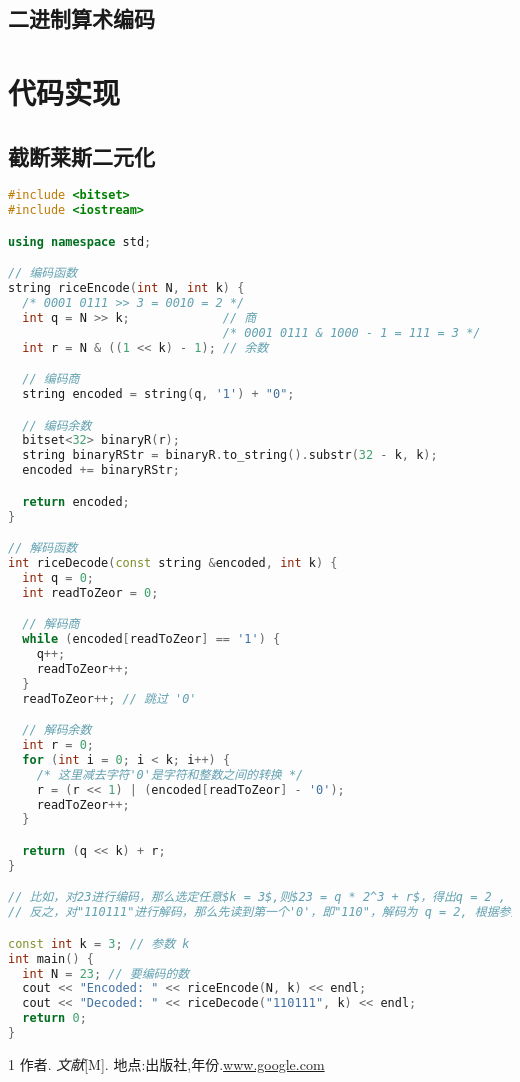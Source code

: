 \documentclass{/home/hi/Study/template/code}
\begin{document}
\subsection{二进制算术编码}


\newpage
\section{代码实现}
\subsection{截断莱斯二元化}
\begin{lstlisting}[language=c++]
#include <bitset>
#include <iostream>

using namespace std;

// 编码函数
string riceEncode(int N, int k) {
  /* 0001 0111 >> 3 = 0010 = 2 */
  int q = N >> k;             // 商
                              /* 0001 0111 & 1000 - 1 = 111 = 3 */
  int r = N & ((1 << k) - 1); // 余数

  // 编码商
  string encoded = string(q, '1') + "0";

  // 编码余数
  bitset<32> binaryR(r);
  string binaryRStr = binaryR.to_string().substr(32 - k, k);
  encoded += binaryRStr;

  return encoded;
}

// 解码函数
int riceDecode(const string &encoded, int k) {
  int q = 0;
  int readToZeor = 0;

  // 解码商
  while (encoded[readToZeor] == '1') {
    q++;
    readToZeor++;
  }
  readToZeor++; // 跳过 '0'

  // 解码余数
  int r = 0;
  for (int i = 0; i < k; i++) {
    /* 这里减去字符'0'是字符和整数之间的转换 */
    r = (r << 1) | (encoded[readToZeor] - '0');
    readToZeor++;
  }

  return (q << k) + r;
}

// 比如，对23进行编码，那么选定任意$k = 3$,则$23 = q * 2^3 + r$，得出q = 2 , r = 7，则q = "110" , r = "111"，则编码结果为"110111"
// 反之，对"110111"进行解码，那么先读到第一个'0'，即"110"，解码为 q = 2, 根据参数k=3可知，再继续读取3位则为余数r = b'111' = 7, 故$2 * 2^3 + 7 = 23$

const int k = 3; // 参数 k
int main() {
  int N = 23; // 要编码的数
  cout << "Encoded: " << riceEncode(N, k) << endl;
  cout << "Decoded: " << riceDecode("110111", k) << endl;
  return 0;
}
\end{lstlisting}

\newpage
\begin{thebibliography}{1}
	 作者. \emph{文献}[M]. 地点:出版社,年份.\url{www.google.com}
\end{thebibliography}
\end{document}
